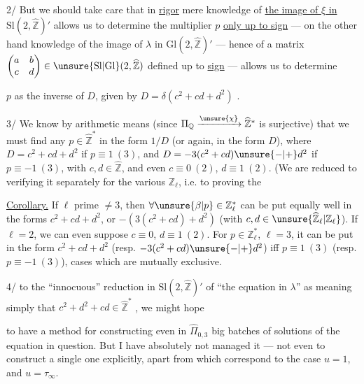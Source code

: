2/ But we should take care that in  \uline{rigor} mere knowledge of \uline{the image of $\xi$ in} $\mathrm{Sl}(2,\widehat{\mathbb Z})'$ allows us to determine the multiplier $p$ \uline{only up to sign} --- on the other hand knowledge of the image of $\lambda$ in $\mathrm{Gl}(2,\widehat{\mathbb Z})'$ --- hence of a matrix $\begin{pmatrix}a&b\\c&d\end{pmatrix}\in\unsure{\mathrm{Sl}|\mathrm{Gl}}(2,\widehat{\mathbb Z})$ defined up to \uline{sign} --- allows us to determine


$p$ as the inverse of $D$, given  by $D=\delta(c^2+cd+d^2)$ . 

3/ We know by arithmetic means (since $\Pi_{\mathbb Q}\xrightarrow{\unsure{\chi}}\widehat{\mathbb Z}^{*}$ is surjective) that we must find any $p\in\widehat{\mathbb Z}^{*}$ in the form $1/D$ (or again, in the form $D$), where $D=c^2+cd+d^2$ if $p\equiv1\ (3)$, and $D=-3(c^2+cd)\unsure{-|+}d^2$ if $p\equiv-1\ (3)$, with $c,d\in\widehat{\mathbb Z}$, and even $c\equiv0\ (2)$, $d\equiv1\ (2)$.  (We are reduced to verifying it separately for the various $\mathbb Z_\ell$, i.e. to proving the

\uline{Corollary.}  If $\ell$  prime $\ne3$, then $\forall\unsure{\beta|p}\in\mathbb Z_\ell^{*}$ can be put equally well in the forms $c^2+cd+d^2$, or $-(3(c^2+cd)+d^2)$ (with $c,d\in\unsure{\widehat{\mathbb Z}_\ell|\mathbb Z_\ell}$). If $\ell=2$, we can even suppose $c\equiv0$, $d\equiv1\ (2)$. For $p\in\mathbb Z_\ell^{*}$, $\ell=3$, it can be put in the form $c^2+cd+d^2$ (resp. $-3(c^2+cd)\unsure{-|+}d^2$) iff $p\equiv1\ (3)$ (resp. $p\equiv-1\ (3)$), cases which are mutually exclusive.

4/  to the ``innocuous'' reduction in $\mathrm{Sl}(2,\widehat{\mathbb Z})'$ of ``the equation in $\lambda$'' as meaning simply that $c^2+d^2+cd\in\widehat{\mathbb Z}^{*}$ , we might hope


to have a method for constructing even in $\widehat{\Pi}_{0,3}$ big batches of solutions of the equation in question. But I have absolutely not managed it --- not even to construct a single one explicitly, apart from  which correspond to the case $u=1$, and $u=\tau_\infty$.

